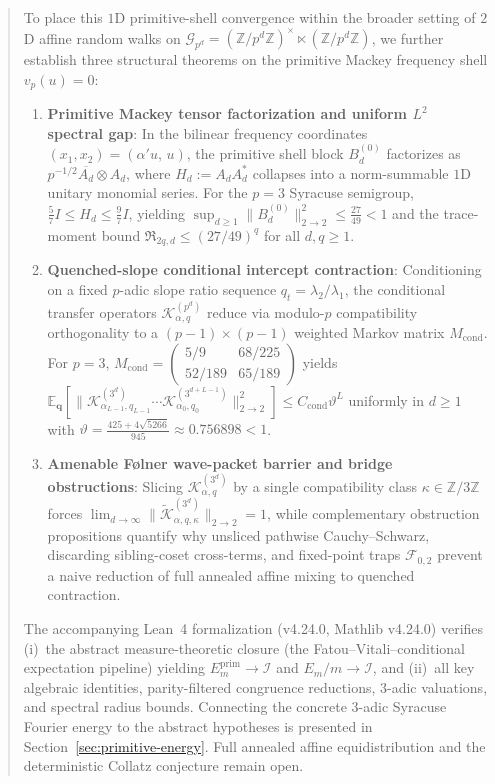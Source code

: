 \documentclass[11pt,a4paper]{article}
\numberwithin{equation}{section}
\theoremstyle{definition}
\theoremstyle{remark}
\newcommand{\Z}{\mathbb{Z}}
\newcommand{\E}{\mathbb{E}}
\newcommand{\cG}{\mathcal{G}}
\newcommand{\cF}{\mathcal{F}}
\newcommand{\cK}{\mathcal{K}}
\newcommand{\cI}{\mathcal{I}}
\newcommand{\prim}{\mathrm{prim}}
\begin{document}
\begin{abstract}
To place this $1$D primitive-shell convergence within the broader setting of $2$D affine random walks on $\cG_{p^d} = (\Z/p^d\Z)^\times \ltimes (\Z/p^d\Z)$, we further establish three structural theorems on the primitive Mackey frequency shell $v_p(u) = 0$:
\begin{enumerate}[label=(\arabic*),topsep=3pt,itemsep=2pt]
\item \textbf{Primitive Mackey tensor factorization and uniform $L^2$ spectral gap}: In the bilinear frequency coordinates $(x_1, x_2) = (\alpha' u,\, u)$, the primitive shell block $B_d^{(0)}$ factorizes as $p^{-1/2}\overline{A_d}\otimes A_d$, where $H_d := A_d A_d^*$ collapses into a norm-summable $1$D unitary monomial series. For the $p=3$ Syracuse semigroup, $\frac{5}{7} I \le H_d \le \frac{9}{7} I$, yielding $\sup_{d \ge 1}\|B_d^{(0)}\|_{2\to 2}^2 \le \frac{27}{49} < 1$ and the trace-moment bound $\mathfrak{R}_{2q, d} \le (27/49)^q$ for all $d, q \ge 1$.
\item \textbf{Quenched-slope conditional intercept contraction}: Conditioning on a fixed $p$-adic slope ratio sequence $q_t = \lambda_2/\lambda_1$, the conditional transfer operators $\cK_{\alpha, q}^{(p^d)}$ reduce via modulo-$p$ compatibility orthogonality to a $(p-1)\times(p-1)$ weighted Markov matrix $M_{\mathrm{cond}}$. For $p=3$, $M_{\mathrm{cond}} = \begin{pmatrix} 5/9 & 68/225 \\ 52/189 & 65/189 \end{pmatrix}$ yields $\E_{\boldsymbol{q}}[\|\cK_{\alpha_{L-1}, q_{L-1}}^{(3^d)}\cdots \cK_{\alpha_0, q_0}^{(3^{d+L-1})}\|_{2\to 2}^2] \le C_{\mathrm{cond}} \vartheta^L$ uniformly in $d \ge 1$ with $\vartheta = \frac{425 + 4\sqrt{5266}}{945} \approx 0.756898 < 1$.
\item \textbf{Amenable F{\o}lner wave-packet barrier and bridge obstructions}: Slicing $\cK_{\alpha, q}^{(3^d)}$ by a single compatibility class $\kappa \in \Z/3\Z$ forces $\lim_{d\to\infty}\|\widetilde{\cK}_{\alpha, q, \kappa}^{(3^d)}\|_{2\to 2} = 1$, while complementary obstruction propositions quantify why unsliced pathwise Cauchy--Schwarz, discarding sibling-coset cross-terms, and fixed-point traps $\cF_{0,2}$ prevent a naive reduction of full annealed affine mixing to quenched contraction.
\end{enumerate}
The accompanying Lean~4 formalization (v4.24.0, Mathlib v4.24.0) verifies (i)~the abstract measure-theoretic closure (the Fatou--Vitali--conditional expectation pipeline) yielding $E_m^{\prim} \to \cI$ and $E_m/m \to \cI$, and (ii)~all key algebraic identities, parity-filtered congruence reductions, $3$-adic valuations, and spectral radius bounds. Connecting the concrete $3$-adic Syracuse Fourier energy to the abstract hypotheses is presented in Section~\ref{sec:primitive-energy}. Full annealed affine equidistribution and the deterministic Collatz conjecture remain open.


\end{abstract}
\end{document}
